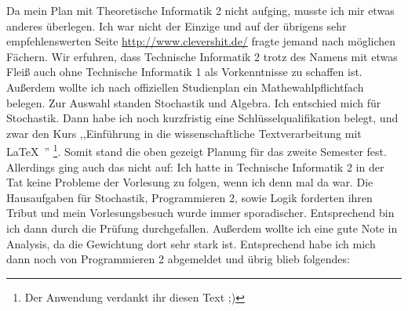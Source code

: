 \begin{multicols}{2}
Da mein Plan mit Theoretische Informatik 2 nicht aufging, musste ich
mir etwas anderes überlegen. Ich war nicht der Einzige und auf der
übrigens sehr empfehlenswerten Seite \url{http://www.clevershit.de/}
fragte jemand nach möglichen Fächern. Wir erfuhren, dass Technische
Informatik 2 trotz des Namens mit etwas Fleiß auch ohne Technische
Informatik 1 als Vorkenntnisse zu schaffen ist. Außerdem wollte ich
nach offiziellen Studienplan ein Mathewahlpflichtfach belegen. Zur
Auswahl standen Stochastik und Algebra. Ich entschied mich für
Stochastik. Dann habe ich  noch kurzfristig eine
Schlüsselqualifikation belegt, und zwar den Kurs ,,Einführung in die
wissenschaftliche Textverarbeitung mit \LaTeX\ '' \footnote{Der
  Anwendung verdankt ihr diesen Text ;)}.%
Somit stand die oben gezeigt Planung für das zweite Semester fest.
Allerdings ging auch das nicht auf: Ich hatte in Technische Informatik
2 in der Tat keine Probleme der Vorlesung zu folgen, wenn ich denn mal
da war. Die Hausaufgaben für Stochastik, Programmieren 2, sowie Logik
forderten ihren Tribut und mein Vorlesungsbesuch wurde immer
sporadischer. Entsprechend bin ich dann durch die Prüfung
durchgefallen. Außerdem wollte ich eine gute Note in Analysis, da die
Gewichtung dort sehr stark ist. Entsprechend habe ich mich dann noch
von Programmieren 2 abgemeldet und übrig blieb folgendes:


\end{multicols}
